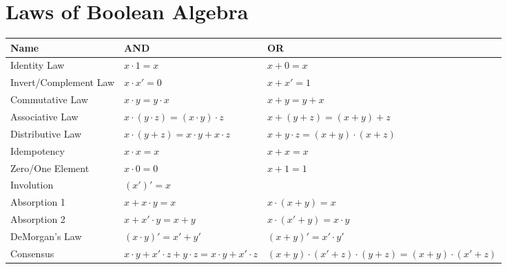 \section*{Laws of Boolean Algebra}
\begin{tabularx}{\linewidth}{lXX}
	\toprule
	\textbf{Name}         & \textbf{AND}                                                  & \textbf{OR}                                                     \\
	\midrule
	Identity Law          & $x \cdot 1 = x$                                               & $x + 0 = x$                                                     \\
	Invert/Complement Law & $x \cdot x' = 0$                                              & $x + x' = 1$                                                    \\
	Commutative Law       & $x \cdot y = y \cdot x$                                       & $x + y = y + x$                                                 \\
	Associative Law       & $x \cdot (y \cdot z) = (x \cdot y) \cdot z$                   & $x + (y + z) = (x + y) + z$                                     \\
	Distributive Law      & $x \cdot (y + z) = x \cdot y + x \cdot z$                     & $x + y \cdot z = (x + y) \cdot (x + z)$                         \\
	\midrule
	Idempotency           & $x \cdot x = x$                                               & $x + x = x$                                                     \\
	Zero/One Element      & $x \cdot 0 = 0$                                               & $x + 1 = 1$                                                     \\
	Involution            & $(x')' = x$                                                   &                                                                 \\
	Absorption 1          & $x + x \cdot y = x$                                           & $x \cdot (x + y) = x$                                           \\
	Absorption 2          & $x + x' \cdot y = x + y$                                      & $x \cdot (x' + y) = x \cdot y$                                  \\
	DeMorgan's Law        & $(x \cdot y)' = x' + y'$                                      & $(x + y)' = x' \cdot y'$                                        \\
	Consensus             & $x \cdot y + x' \cdot z + y \cdot z = x \cdot y + x' \cdot z$ & $(x + y) \cdot (x' + z) \cdot (y + z) = (x + y) \cdot (x' + z)$ \\
	\bottomrule
\end{tabularx}
